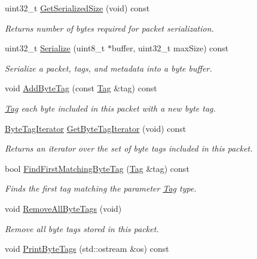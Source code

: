 \begin{DoxyCompactItemize}
uint32\+\_\+t \hyperlink{classns3_1_1Packet_a7416c3bc8c1a9a86c8ade4dfd1d67d2d}{Get\+Serialized\+Size} (void) const 
\begin{DoxyCompactList}\small\item\em Returns number of bytes required for packet serialization. \end{DoxyCompactList}\item 
uint32\+\_\+t \hyperlink{classns3_1_1Packet_a939e41b065c6f9f77d3f51373baeaf7e}{Serialize} (uint8\+\_\+t $\ast$buffer, uint32\+\_\+t max\+Size) const 
\begin{DoxyCompactList}\small\item\em Serialize a packet, tags, and metadata into a byte buffer. \end{DoxyCompactList}\item 
void \hyperlink{classns3_1_1Packet_ad5997caea8c22757acade2fcb4d7daca}{Add\+Byte\+Tag} (const \hyperlink{classns3_1_1Tag}{Tag} \&tag) const 
\begin{DoxyCompactList}\small\item\em \hyperlink{classns3_1_1Tag}{Tag} each byte included in this packet with a new byte tag. \end{DoxyCompactList}\item 
\hyperlink{classns3_1_1ByteTagIterator}{Byte\+Tag\+Iterator} \hyperlink{classns3_1_1Packet_a3c03f35c267e8534c29bdaa4686e4823}{Get\+Byte\+Tag\+Iterator} (void) const 
\begin{DoxyCompactList}\small\item\em Returns an iterator over the set of byte tags included in this packet. \end{DoxyCompactList}\item 
bool \hyperlink{classns3_1_1Packet_a2e1403c2411495827012fe000823c16a}{Find\+First\+Matching\+Byte\+Tag} (\hyperlink{classns3_1_1Tag}{Tag} \&tag) const 
\begin{DoxyCompactList}\small\item\em Finds the first tag matching the parameter \hyperlink{classns3_1_1Tag}{Tag} type. \end{DoxyCompactList}\item 
void \hyperlink{classns3_1_1Packet_a083f54c9db31aeff30551a9e20fcda42}{Remove\+All\+Byte\+Tags} (void)
\begin{DoxyCompactList}\small\item\em Remove all byte tags stored in this packet. \end{DoxyCompactList}\item 
void \hyperlink{classns3_1_1Packet_af3766d81feb51b754cb036526c2f4366}{Print\+Byte\+Tags} (std\+::ostream \&os) const 

\end{DoxyCompactItemize}

